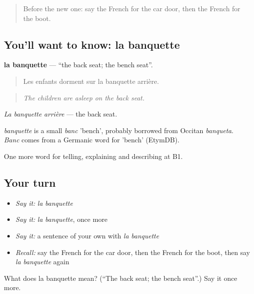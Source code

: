 \label{lesson:FR-C406-banquette}



\begin{quote}
Before the new one: say the French for the car door, then the French for the boot.
\end{quote}

\subsection*{You'll want to know: la banquette}
\textbf{la banquette} — \textquotedblleft{}the back seat; the bench seat\textquotedblright{}.

\begin{quote}
Les enfants dorment sur la banquette arrière.
\end{quote}

\begin{quote}
\emph{The children are asleep on the back seat.}
\end{quote}

\emph{La banquette arrière} — the back seat.

\begin{cousinweb}
\emph{banquette} is a small \emph{banc} 'bench', probably borrowed from Occitan \emph{banqueta}. \emph{Banc} comes from a Germanic word for 'bench' (EtymDB).
\end{cousinweb}

\begin{grammarlens}[title={What you've built}]
One more word for telling, explaining and describing at B1.
\end{grammarlens}

\subsection*{Your turn}
\begin{itemize}
\raggedright
  \item \emph{Say it:} \emph{la banquette}
  \item \emph{Say it:} \emph{la banquette}, once more
  \item \emph{Say it:} a sentence of your own with \emph{la banquette}
  \item \emph{Recall:} say the French for the car door, then the French for the boot, then say \emph{la banquette} again
\end{itemize}

\begin{tcolorbox}[breakable,colback=teal!4,colframe=teal!35!black,title={Before you move on}]
What does la banquette mean? (\textquotedblleft{}The back seat; the bench seat\textquotedblright{}.) Say it once more.
\end{tcolorbox}
